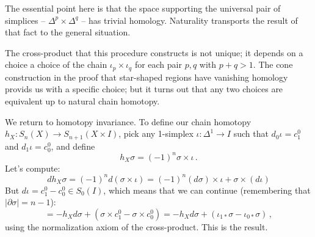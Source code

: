 The essential point here is that the space supporting the universal pair of
simplices -- $\Delta^p\times\Delta^q$ -- has trivial homology. Naturality 
transports the result of that fact to the general situation. 
 
The cross-product that this procedure constructs is not unique; it depends on a choice a choice of the chain $\iota_p\times\iota_q$ for each pair $p,q$ with $p+q>1$. The cone construction in the proof that star-shaped regions have vanishing homology provids us with a specific choice; but it turns out that any two choices are equivalent up to natural chain homotopy. 

We return to homotopy invariance. To define our chain homotopy
$h_X:S_n(X)\to S_{n+1}(X\times I)$, pick any 1-simplex $\iota:\Delta^1\to I$
such that $d_0\iota=c_1^0$ and $d_1\iota=c_0^0$, and define
\[
h_X\sigma =(-1)^n\sigma\times\iota\,.
\]
Let's compute:
		\begin{equation*}
		dh_X\sigma =(-1)^nd(\sigma\times \iota) = 
(-1)^n(d\sigma)\times\iota + \sigma\times(d\iota)
		\end{equation*}
But $d\iota = c_1^0 - c_0^0\in S_0(I)$, 
which means that we can continue (remembering that $|\partial\sigma|=n-1$):
\[
=-h_X d\sigma+(\sigma\times c_1^0-\sigma\times c_0^0)
=-h_X d\sigma+(\iota_{1*}\sigma-\iota_{0*}\sigma)\,,
\]
using the normalization axiom of the cross-product. This is the result.


